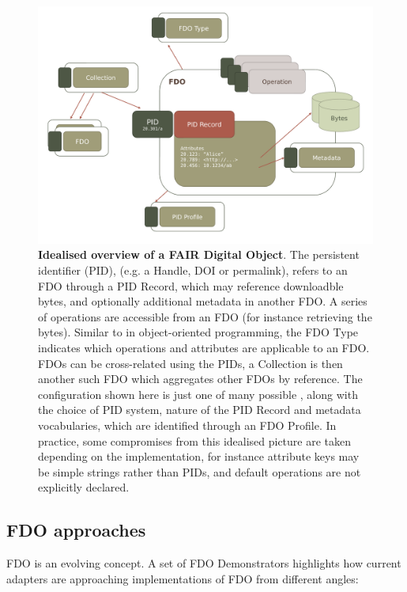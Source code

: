 \begin{figure}[hbt]
  \includegraphics[width=\textwidth]{figures/ch03/fdo.pdf}
    \caption[Idealised overview of a FAIR Digital Object]{\textbf{Idealised overview of a FAIR Digital Object}. The persistent identifier (PID), (e.g. a Handle, DOI or permalink), refers to an FDO through a PID Record, which may reference downloadble bytes, and optionally additional metadata in another FDO. A series of operations are accessible from an FDO (for instance retrieving the bytes). Similar to in object-oriented programming, the FDO Type indicates which operations and attributes are applicable to an FDO. FDOs can be cross-related using the PIDs, a Collection is then another such FDO which aggregates other FDOs by reference. The configuration shown here is just one of many possible \cite{fdo-ConfigurationTypes}, along with the choice of PID system, nature of the PID Record and metadata vocabularies, which are identified through an FDO Profile. In practice, some compromises from this idealised picture are taken depending on the implementation, for instance attribute keys may be simple strings rather than PIDs, and default operations are not explicitly declared.
    }
  \label{ch3:fig:fdo}
\end{figure}

\subsection{FDO approaches}\label{ch3:fdo-approaches}

FDO is an evolving concept. A set of FDO Demonstrators \cite{wittenburgFAIRDigitalObject2022b} highlights how current adapters are approaching implementations of FDO from different angles:


